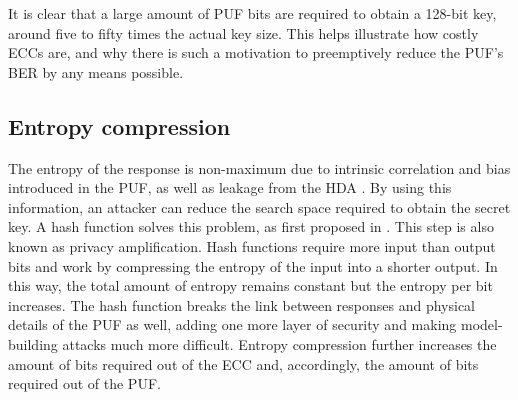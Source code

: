 \begin{table}[H]
  \centering
  \caption{Comparison of different ECC approaches with aimed KER 1 E-4 \% showing required PUF bits and redundancy for a key length of 128 bits and a presumed BER of 15\%. }
  \label{tab:ECCs}%
\end{table}%

It is clear that a large amount of PUF bits are required to obtain a 128-bit key, around five to fifty times the actual key size. This helps illustrate how costly ECCs are, and why there is such a motivation to preemptively reduce the PUF's BER by any means possible. 


\subsection{Entropy compression}

The entropy of the response is non-maximum due to intrinsic correlation and bias introduced in the PUF, as well as leakage from the HDA \cite{Delvaux2015}. By using this information, an attacker can reduce the search space required to obtain the secret key. A hash function solves this problem, as first proposed in \cite{Gassend2002}. This step is also known as privacy amplification.  Hash functions require more input than output bits and work by compressing the entropy of the input into a shorter output. In this way, the total amount of entropy remains constant but the entropy per bit increases. The hash function breaks the link between responses and physical details of the PUF as well, adding one more layer of security and making model-building attacks much more difficult. Entropy compression further increases the amount of bits required out of the ECC and, accordingly, the amount of bits required out of the PUF. 

